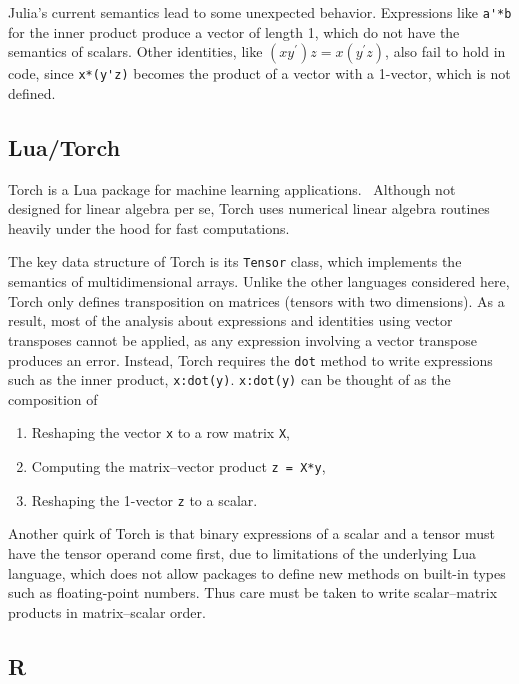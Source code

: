 Julia's current semantics lead to some unexpected behavior. Expressions like
\verb|a'*b| for the inner product produce a vector of length 1, which do not
have the semantics of scalars. Other identities, like $(xy^\prime)z =
x(y^\prime z)$, also fail to hold in code, since \verb|x*(y'z)| becomes the
product of a vector with a 1-vector, which is not defined.


\subsection{Lua/Torch}

Torch is a Lua package for machine learning applications.~\cite{Torch}
Although not designed for linear algebra per se, Torch uses numerical linear
algebra routines heavily under the hood for fast computations.

The key data structure of Torch is its \verb|Tensor| class, which implements
the semantics of multidimensional arrays. Unlike the other languages considered
here, Torch only defines transposition on matrices (tensors with two
dimensions). As a result, most of the analysis about expressions and identities
using vector transposes cannot be applied, as any expression involving a vector
transpose produces an error.
Instead, Torch requires the \verb|dot| method to write expressions such as the inner product,
\verb|x:dot(y)|. \verb|x:dot(y)| can be thought of as the composition of
\begin{enumerate}

\item
Reshaping the vector \verb|x| to a row matrix \verb|X|,

\item
Computing the matrix--vector product \verb|z = X*y|,

\item
Reshaping the 1-vector \verb|z| to a scalar.

\end{enumerate}

Another quirk of Torch is that binary expressions of a scalar and a tensor must
have the tensor operand come first, due to limitations of the underlying Lua
language, which does not allow packages to define new methods on built-in
types such as floating-point numbers. Thus care must be taken to write
scalar--matrix products in matrix--scalar order.


\subsection{R}

